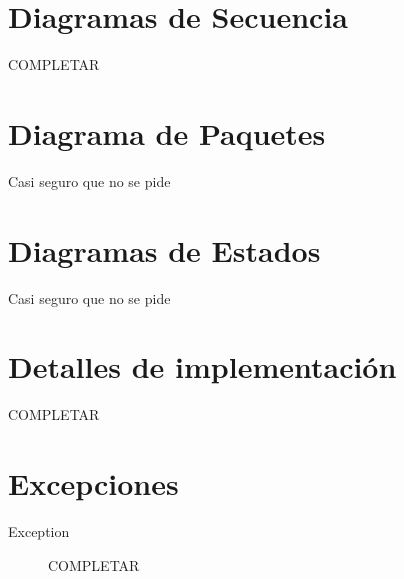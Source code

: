 \documentclass[titlepage,a4paper]{article}
\begin{document}
\section{Diagramas de Secuencia}

COMPLETAR


\section{Diagrama de Paquetes}

Casi seguro que no se pide

\section{Diagramas de Estados}

Casi seguro que no se pide

\section{Detalles de implementación}

COMPLETAR

\section{Excepciones}

\begin{description}
\item[Exception] COMPLETAR
\end{description}
\end{document}
